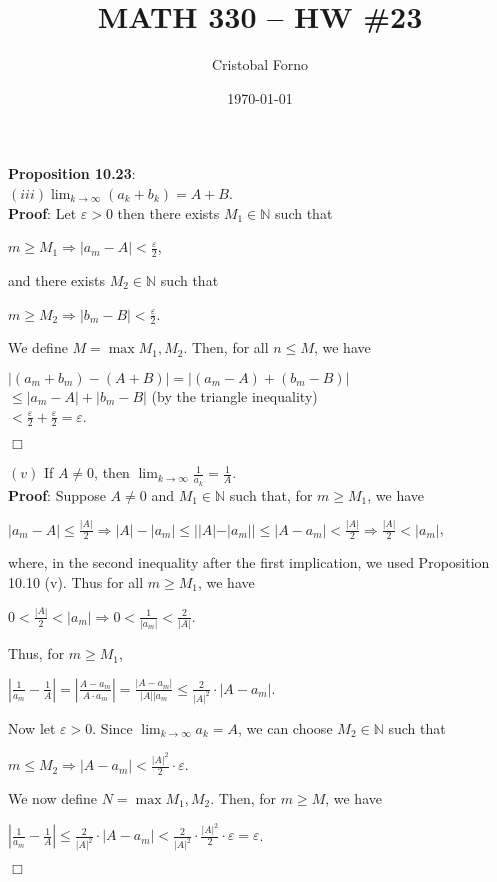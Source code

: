 \documentclass[12pt]{article}
\title{MATH 330 -- HW \#23}
\author{Cristobal Forno}
\date{\today}
\begin{document}
\maketitle

\noindent
\textbf{Proposition 10.23}:\\
\noindent
$(iii) \lim_{k\to\infty} (a_k + b_k) = A + B$.\\
\indent
\textbf{Proof}: Let $\varepsilon > 0$ then there exists $M_1 \in \mathbb{N}$
such that
\begin{center}
  $m \geq M_1 \Longrightarrow |a_m - A| < \frac{\varepsilon}{2}$,
\end{center}
and there exists $M_2 \in \mathbb{N}$ such that
\begin{center}
  $m \geq M_2 \Longrightarrow |b_m - B| < \frac{\varepsilon}{2}$.
\end{center}
We define $M = \max{M_1, M_2}$. Then, for all $n \leq M$, we have
\begin{center}
  $|(a_m+b_m)-(A+B)|=|(a_m-A)+(b_m-B)|$\\
  $\leq |a_m-A|+|b_m-B|$ (by the triangle inequality)\\
  $< \frac{\varepsilon}{2} + \frac{\varepsilon}{2} = \varepsilon$.
\end{center}
$\Box$

\noindent
$(v)$ If $A \neq 0$, then $\lim_{k\to\infty} \frac{1}{a_k} = \frac{1}{A}$.\\
\indent
\textbf{Proof}:
Suppose $A \neq 0$ and $M_1 \in \mathbb{N}$ such that, for $m \geq M_1$, we have
\begin{center}
  $|a_m-A| \leq \frac{|A|}{2} \Longrightarrow |A| - |a_m| \leq ||A| - |a_m||
  \leq |A-a_m| < \frac{|A|}{2} \Longrightarrow \frac{|A|}{2} < |a_m|$,
\end{center}
where, in the second inequality after the first implication, we used Proposition
10.10 (v). Thus for all $m \geq M_1$, we have
\begin{center}
  $0 < \frac{|A|}{2} < |a_m| \Longrightarrow 0 < \frac{1}{|a_m|}<
  \frac{2}{|A|}$.
\end{center}
Thus, for $m \geq M_1$,
\begin{center}
  $|\frac{1}{a_m} - \frac{1}{A}| = |\frac{A-a_m}{A \cdot a_m }|=
  \frac{|A-a_m|}{|A||a_m} \leq \frac{2}{|A|^2}\cdot |A-a_m|$.
\end{center}
Now let $\varepsilon > 0$. Since $\lim_{k\to\infty}a_k=A$, we can choose $M_2
\in \mathbb{N}$ such that
\begin{center}
  $m \leq M_2 \Longrightarrow |A-a_m| < \frac{|A|^2}{2}\cdot\varepsilon$.
\end{center}
We now define $N = \max{M_1, M_2}$. Then, for $m \geq M$, we have
\begin{center}
  $|\frac{1}{a_m}-\frac{1}{A}| \leq \frac{2}{|A|^2}\cdot|A-a_m|<
  \frac{2}{|A|^2}\cdot\frac{|A|^2}{2}\cdot\varepsilon=\varepsilon$.
\end{center}
$\Box$
\end{document}
